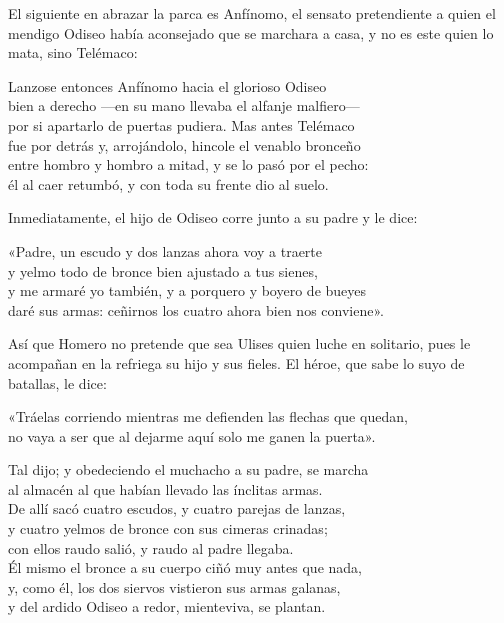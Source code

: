 El siguiente en abrazar la parca es Anfínomo, el sensato pretendiente a quien el mendigo Odiseo había aconsejado que se marchara a casa, y no es este quien lo mata, sino Telémaco:

\begin{versocita}
Lanzose entonces Anfínomo hacia el glorioso Odiseo\\
bien a derecho ---en su mano llevaba el alfanje malfiero---\\
por si apartarlo de puertas pudiera. Mas antes Telémaco\\
fue por detrás y, arrojándolo, hincole el venablo bronceño\\
entre hombro y hombro a mitad, y se lo pasó por el pecho:\\
él al caer retumbó, y con toda su frente dio al suelo.
\end{versocita}

Inmediatamente, el hijo de Odiseo corre junto a su padre y le dice:

\begin{versocita}
«Padre, un escudo y dos lanzas ahora voy a traerte\\
y yelmo todo de bronce bien ajustado a tus sienes,\\
y me armaré yo también, y a porquero y boyero de bueyes\\
daré sus armas: ceñirnos los cuatro ahora bien nos conviene».
\end{versocita}

Así que Homero no pretende que sea Ulises quien luche en solitario, pues le acompañan en la refriega su hijo y sus fieles. El héroe, que sabe lo suyo de batallas, le dice:

\begin{versocita}
«Tráelas corriendo mientras me defienden las flechas que quedan,\\
no vaya a ser que al dejarme aquí solo me ganen la puerta».
\end{versocita}

\begin{versocita}
Tal dijo; y obedeciendo el muchacho a su padre, se marcha\\
al almacén al que habían llevado las ínclitas armas.\\
De allí sacó cuatro escudos, y cuatro parejas de lanzas,\\
y cuatro yelmos de bronce con sus cimeras crinadas;\\
con ellos raudo salió, y raudo al padre llegaba.\\
Él mismo el bronce a su cuerpo ciñó muy antes que nada,\\
y, como él, los dos siervos vistieron sus armas galanas,\\
y del ardido Odiseo a redor, mienteviva, se plantan.
\end{versocita}

